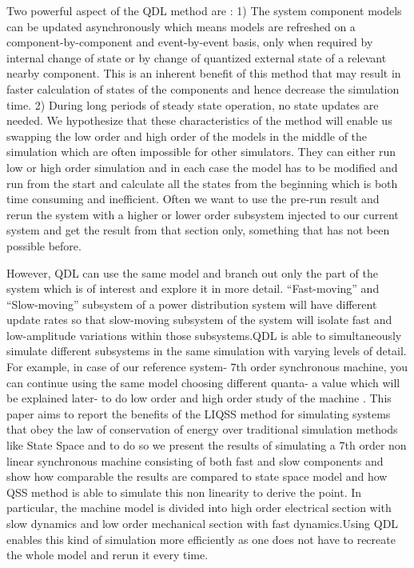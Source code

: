 \documentclass{scspaperproc}
\theoremstyle{scsthe}
\begin{document}
Two powerful aspect of the QDL method are : 1) The system component models can be updated asynchronously which means models are refreshed on a component-by-component and event-by-event basis, only when required by internal change of state or by change of quantized external state of a relevant nearby component. This is an inherent benefit of this method that may result in faster calculation of states of the components and hence decrease the simulation time. 2) During long periods of steady state operation, no state updates are needed. We hypothesize that these characteristics of the method will enable us swapping the low order and high order of the models in the middle of the simulation which are often impossible for other simulators. They can either run low or high order simulation and in each case the model has to be modified and run from the start and calculate all the states from the beginning which is both time consuming and inefficient. Often we want to use the pre-run result and rerun the system with a higher or lower order subsystem injected to our current system and get the result from that section only, something that has not been possible before. 

However, QDL can use the same model and branch out only the part of the system which is of interest and explore it in more detail. “Fast-moving” and “Slow-moving” subsystem of a power distribution system will have different update rates so that slow-moving subsystem of the system will isolate fast and low-amplitude variations within those subsystems.QDL is able to simultaneously simulate different subsystems in the same simulation with varying levels of detail. For example, in case of our reference system- 7th order synchronous machine, you can continue using the same model choosing different quanta- a value which will be explained later- to do low order and high order study of the machine . This paper aims to report the benefits of the LIQSS method for simulating systems that obey the law of conservation of energy over traditional simulation methods like State Space and to do so we present the results of simulating a 7th order non linear synchronous machine consisting of both fast and slow components and show how comparable the results are compared to state space model and how QSS method is able to simulate this non linearity to derive the point. In particular, the machine model is divided into high order electrical section with slow dynamics and low order mechanical section with fast dynamics.Using QDL enables this kind of simulation more efficiently as one does not have to recreate the whole model and rerun it every time. 
\end{document}
